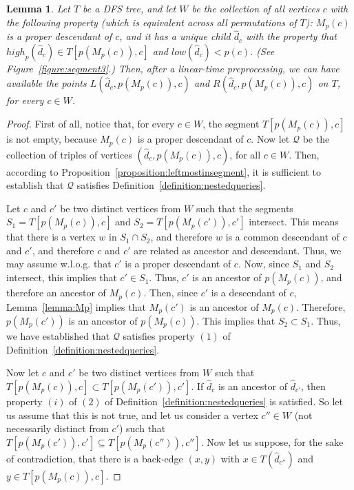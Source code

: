 \documentclass[11pt,a4paper]{article}
\newtheorem{lemma}[theorem]{Lemma}
\begin{document}
\begin{lemma}
\label{lemma:segmentpointsspecial}
Let $T$ be a DFS tree, and let $W$ be the collection of all vertices $c$ with the following property (which is equivalent across all permutations of $T$): $M_p(c)$ is a proper descendant of $c$, and it has a unique child $\hat{d}_c$ with the property that $\mathit{high}_p(\hat{d}_c)\in T[p(M_p(c)),c]$ and $\mathit{low}(\hat{d}_c)<p(c)$. (See Figure~\ref{figure:segment3}.) Then, after a linear-time preprocessing, we can have available the points $L(\hat{d}_c,p(M_p(c)),c)$ and $R(\hat{d}_c,p(M_p(c)),c)$ on $T$, for every $c\in W$.
\end{lemma}
\begin{proof}
First of all, notice that, for every $c\in W$, the segment $T[p(M_p(c)),c]$ is not empty, because $M_p(c)$ is a proper descendant of $c$. Now let $\mathcal{Q}$ be the collection of triples of vertices $(\hat{d}_c,p(M_p(c)),c)$, for all $c\in W$. Then, according to Proposition~\ref{proposition:leftmostinsegment}, it is sufficient to establish that $\mathcal{Q}$ satisfies Definition~\ref{definition:nestedqueries}.

Let $c$ and $c'$ be two distinct vertices from $W$ such that the segments $S_1=T[p(M_p(c)),c]$ and $S_2=T[p(M_p(c')),c']$ intersect. This means that there is a vertex $w$ in $S_1\cap S_2$, and therefore $w$ is a common descendant of $c$ and $c'$, and therefore $c$ and $c'$ are related as ancestor and descendant. Thus, we may assume w.l.o.g. that $c'$ is a proper descendant of $c$. Now, since $S_1$ and $S_2$ intersect, this implies that $c'\in S_1$. Thus, $c'$ is an ancestor of $p(M_p(c))$, and therefore an ancestor of $M_p(c)$. Then, since $c'$ is a descendant of $c$, Lemma~\ref{lemma:Mp} implies that $M_p(c')$ is an ancestor of $M_p(c)$. Therefore, $p(M_p(c'))$ is an ancestor of $p(M_p(c))$. This implies that $S_2\subset S_1$. Thus, we have established that $\mathcal{Q}$ satisfies property $(1)$ of Definition~\ref{definition:nestedqueries}.

Now let $c$ and $c'$ be two distinct vertices from $W$ such that $T[p(M_p(c)),c]\subset T[p(M_p(c')),c']$. If $\hat{d}_{c}$ is an ancestor of $\hat{d}_{c'}$, then property $(i)$ of $(2)$ of Definition~\ref{definition:nestedqueries} is satisfied. So let us assume that this is not true, and let us consider a vertex $c''\in W$ (not necessarily distinct from $c'$) such that $T[p(M_p(c')),c']\subseteq T[p(M_p(c'')),c'']$. Now let us suppose, for the sake of contradiction, that there is a back-edge $(x,y)$ with $x\in T(\hat{d}_{c''})$ and $y\in T[p(M_p(c)),c]$.


\end{proof}
\end{document}
